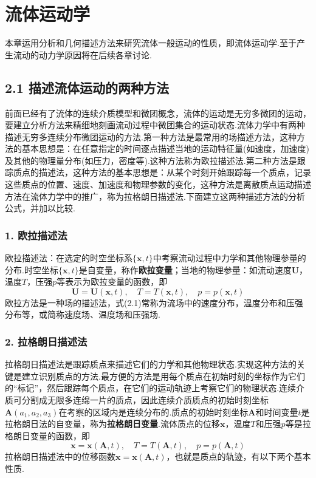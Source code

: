 \chapter{流体运动学}

本章运用分析和几何描述方法来研究流体一般运动的性质，即流体运动学.至于产生流动的动力学原因将在后续各章讨论.

\section*{2.1  描述流体运动的两种方法}

前面已经有了流体的连续介质模型和微团概念，流体的运动是无穷多微团的运动，要建立分析方法来精细地刻画流动过程中微团集合的运动状态.流体力学中有两种描述无穷多连续分布微团运动的方法.第一种方法是最常用的场描述方法，这种方法的基本思想是：在任意指定的时间逐点描述当地的运动特征量(如速度，加速度)及其他的物理量分布(如压力，密度等).这种方法称为欧拉描述法.第二种方法是跟踪质点的描述法，这种方法的基本思想是：从某个时刻开始跟踪每一个质点，记录这些质点的位置、速度、加速度和物理参数的变化，这种方法是离散质点运动描述方法在流体力学中的推广，称为拉格朗日描述法.下面建立这两种描述方法的分析公式，并加以比较.

\subsection*{1. 欧拉描述法}

欧拉描述法：在选定的时空坐标系$\{\boldsymbol{x},t\}$中考察流动过程中力学和其他物理参量的分布.时空坐标$\{\boldsymbol{x},t\}$是自变量，称作\textbf{欧拉变量}；当地的物理参量：如流动速度$\boldsymbol{U}$，温度$T$，压强$p$等表示为欧拉变量的函数，即
\begin{equation*}
\boldsymbol{U}=\boldsymbol{U}(\boldsymbol{x},t),\quad T=T(\boldsymbol{x},t),\quad p=p(\boldsymbol{x},t)
\tag{2.1}
\end{equation*}
欧拉方法是一种场的描述法，式(2.1)常称为流场中的速度分布，温度分布和压强分布等，或简称速度场、温度场和压强场.

\subsection*{2. 拉格朗日描述法}

拉格朗日描述法是跟踪质点来描述它们的力学和其他物理状态.实现这种方法的关键是建立识别质点的方法.最方便的方法是用每个质点在初始时刻的坐标作为它们的“标记”，然后跟踪每个质点，在它们的运动轨迹上考察它们的物理状态.连续介质可分割成无限多连绵一片的质点，因此连续介质质点的初始时刻坐标$\boldsymbol{A}(a_1,a_2,a_3)$在考察的区域内是连续分布的.质点的初始时刻坐标$\boldsymbol{A}$和时间变量$t$是拉格朗日法的自变量，称为\textbf{拉格朗日变量}.流体质点的位移$\boldsymbol{x}$，温度$T$和压强$p$等是拉格朗日变量的函数，即
\begin{equation*}
\boldsymbol{x}=\boldsymbol{x}(\boldsymbol{A},t),\quad T=T(\boldsymbol{A},t),\quad p=p(\boldsymbol{A},t)
\tag{2.2}
\end{equation*}
拉格朗日描述法中的位移函数$\boldsymbol{x}=\boldsymbol{x}(\boldsymbol{A},t)$，也就是质点的轨迹，有以下两个基本性质.

